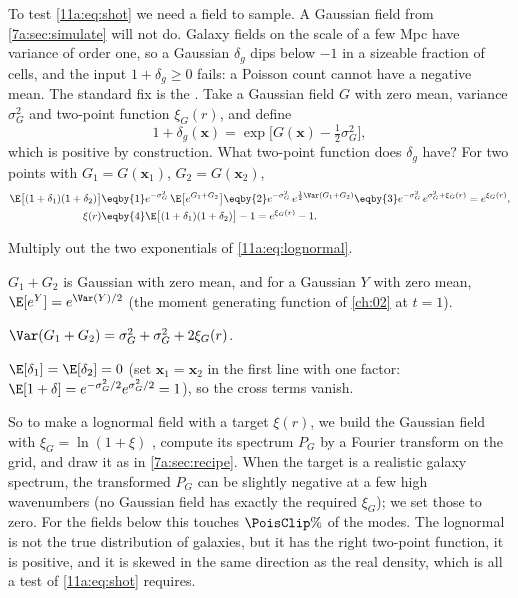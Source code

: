 To test \eqref{11a:eq:shot} we need a field to sample. A Gaussian field from
\cref{7a:sec:simulate} will not do. Galaxy fields on the scale of a few Mpc have
variance of order one, so a Gaussian $\delta_g$ dips below $-1$ in a sizeable
fraction of cells, and the input $1+\delta_g\ge0$ fails: a Poisson count cannot
have a negative mean. The standard fix is the 
\cite{Xavier2016}. Take a Gaussian field $G$ with zero mean, variance $\sigma_G^2$
and two-point function $\xi_G(r)$, and define
\begin{equation}
  1+\delta_g(\bm x)=\exp\bigl[G(\bm x)-\tfrac12\sigma_G^2\bigr],
  \label{11a:eq:lognormal}
\end{equation}
which is positive by construction. What two-point function does $\delta_g$ have?
For two points with $G_1=G(\bm x_1)$, $G_2=G(\bm x_2)$,
\begin{align}
  \E\bigl[(1+\delta_1)(1+\delta_2)\bigr]
  &\eqby{1} e^{-\sigma_G^2}\,\E\bigl[e^{G_1+G_2}\bigr]
   \eqby{2} e^{-\sigma_G^2}\,e^{\frac12\Var(G_1+G_2)}
   \eqby{3} e^{-\sigma_G^2}\,e^{\sigma_G^2+\xi_G(r)}
   = e^{\xi_G(r)},\nonumber\\
  \xi(r)&\eqby{4}\E\bigl[(1+\delta_1)(1+\delta_2)\bigr]-1=e^{\xi_G(r)}-1 .
  \label{11a:eq:lognormal-xi}
\end{align}
\begin{explain}
  \item Multiply out the two exponentials of \eqref{11a:eq:lognormal}.
  \item $G_1+G_2$ is Gaussian with zero mean, and for a Gaussian $Y$ with zero
        mean, $\E[e^Y]=e^{\Var(Y)/2}$ (the moment generating function of
        \cref{ch:02} at $t=1$).
  \item $\Var(G_1+G_2)=\sigma_G^2+\sigma_G^2+2\xi_G(r)$.
  \item $\E[\delta_1]=\E[\delta_2]=0$ (set $\bm x_1=\bm x_2$ in the first line with
        one factor: $\E[1+\delta]=e^{-\sigma_G^2/2}e^{\sigma_G^2/2}=1$), so the
        cross terms vanish.
\end{explain}
So to make a lognormal field with a target $\xi(r)$, we build the Gaussian field
with $\xi_G=\ln(1+\xi)$ , compute its spectrum $P_G$
by a Fourier transform on the grid, and draw it as in \cref{7a:sec:recipe}. When
the target is a realistic galaxy spectrum, the transformed $P_G$ can be slightly
negative at a few high wavenumbers (no Gaussian field has exactly the required
$\xi_G$); we set those to zero. For the fields below this touches
$\PoisClip\%$ of the modes. The lognormal is not the true distribution of
galaxies, but it has the right two-point function, it is positive, and it is
skewed in the same direction as the real density, which is all a test of
\eqref{11a:eq:shot} requires.


